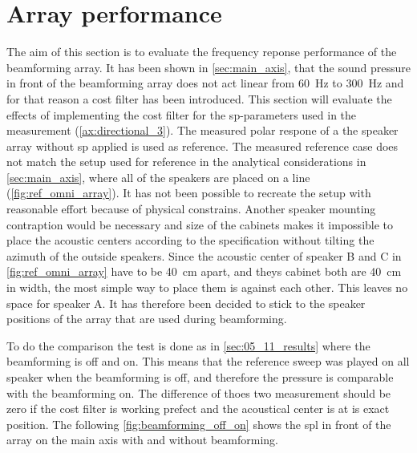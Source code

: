 \section{Array performance} \label{sec:beamforming_array_spl}

The aim of this section is to evaluate the frequency reponse performance of the beamforming array. It has been shown in \autoref{sec:main_axis}, that the sound pressure in front of the beamforming array does not act linear from \SI{60}{\hertz} to \SI{300}{\hertz} and for that reason a cost filter has been introduced. This section will evaluate the effects of implementing the cost filter for the \gls{sp}-parameters used in the measurement (\autoref{ax:directional_3}). The measured polar respone of a the speaker array without \gls{sp} applied is used as reference. 
The measured reference case does not match the setup used for reference in the analytical considerations in \autoref{sec:main_axis}, where all of the speakers are placed on a line (\autoref{fig:ref_omni_array}). It has not been possible to recreate the setup with reasonable effort because of physical constrains. Another speaker mounting contraption would be necessary and size of the cabinets makes it impossible to place the acoustic centers according to the specification without tilting the azimuth of the outside speakers. Since the acoustic center of speaker B and C in \autoref{fig:ref_omni_array} have to be \SI{40}{\centi\meter} apart, and theys cabinet both are \SI{40}{\centi\meter} in width, the most simple way to place them is against each other. This leaves no space for speaker A.
It has therefore been decided to stick to the speaker positions of the array that are used during beamforming.

To do the comparison the test is done as in \autoref{sec:05_11_results} where the beamforming is off and on. This means that the reference sweep was played on all speaker when the beamforming is off, and therefore the pressure is comparable with the beamforming on. The difference of thoes two measurement should be zero if the cost filter is working prefect and the acoustical center is at is exact position. The following \autoref{fig:beamforming_off_on} shows the \gls{spl} in front of the array on the main axis with and without beamforming.

